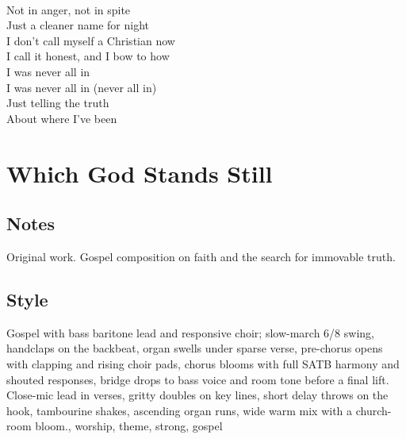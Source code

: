 \begin{lyrics}
\\
Not in anger, not in spite\\
Just a cleaner name for night\\
I don’t call myself a Christian now\\
I call it honest, and I bow to how\\
I was never all in\\
I was never all in
(never all in)\\
Just telling the truth\\
About where I’ve been
\end{lyrics}

\section{Which God Stands Still}

\subsection{Notes}
Original work.
Gospel composition on faith and the search for immovable truth.

\subsection{Style}
Gospel with bass baritone lead and responsive choir; slow-march 6/8 swing, handclaps on the backbeat, organ swells under sparse verse, pre-chorus opens with clapping and rising choir pads, chorus blooms with full SATB harmony and shouted responses, bridge drops to bass voice and room tone before a final lift. Close-mic lead in verses, gritty doubles on key lines, short delay throws on the hook, tambourine shakes, ascending organ runs, wide warm mix with a church-room bloom., worship, theme, strong, gospel

